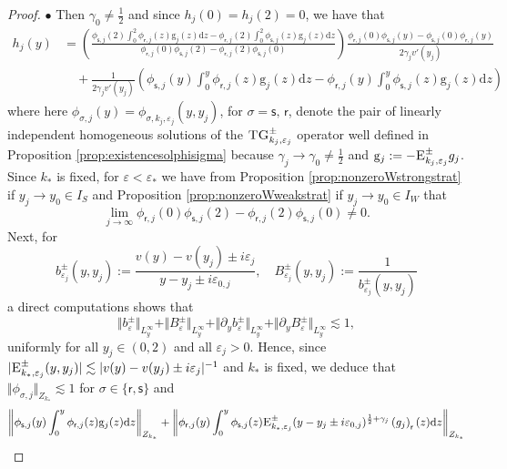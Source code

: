 \documentclass[11pt,reqno]{amsproc}
\newcommand{\bullpar}[1]{\vspace{.5em}\noindent $\bullet$ \normalfont {\bfseries #1.}}
\theoremstyle{definition}
\numberwithin{equation}{section}
\newcommand{\sr}{{\mathsf{r}}}
\newcommand{\s}{{\mathsf{s}}}
\renewcommand{\d}{\mathrm{d}}
\newcommand{\ep}{\varepsilon}
\renewcommand{\P}{{\mathcal{P}}}
\begin{document}
\begin{proof}
\bullpar{Case $\P(y_0)\neq 0$} Then $\gamma_0\neq \frac12$ and since $h_j(0)=h_j(2)=0$, we have that
\begin{align*}
h_j(y)&= \left( \frac{\phi_{\s,j}(2)\int_0^2 \phi_{\sr,j}(z) \mathrm{g}_j(z) \d z - \phi_{\sr,j}(2)\int_0^2 \phi_{\s,j}(z) \mathrm{g}_j(z)\d z }{\phi_{\sr,j}(0)\phi_{\s,j}(2) - \phi_{\sr,j}(2)\phi_{\s,j}(0)} \right)  \frac{\phi_{\sr,j}(0)\phi_{\s,j}(y) - \phi_{\s,j}(0)\phi_{\sr,j}(y)}{2\gamma_j v'(y_j)} \\
&\quad + \frac{1}{2\gamma_jv'(y_j)} \left( \phi_{\s,j}(y) \int_0^y \phi_{\sr,j}(z)\mathrm{g}_j(z) \d z - \phi_{\sr,j}(y) \int_0^y \phi_{\s,j}(z)\mathrm{g}_j(z) \d z \right)
\end{align*}
where here $\phi_{\sigma,j}(y)=\phi_{\sigma,k_j,\ep_j}(y,y_j)$, for $\sigma = \s,\,\sr$, denote the pair of linearly independent homogeneous solutions of the $\textsc{TG}_{k_j,\ep_j}^\pm$ operator well defined in Proposition  \ref{prop:existencesolphisigma} because $\gamma_j\rightarrow \gamma_0\neq\frac12$ and $\mathrm{g}_j:=-\textsc{E}_{k_j,\ep_j}^\pm g_j$. Since $k_*$ is fixed, for $\ep<\ep_*$ we have from Proposition \ref{prop:nonzeroWstrongstrat} if $y_j\rightarrow y_0\in I_S$ and Proposition \ref{prop:nonzeroWweakstrat} if $y_j\rightarrow y_0\in I_W$ that 
\begin{equation}\label{eq:nonzeroweakstrongWlim}
\lim_{j\rightarrow \infty} \phi_{\sr,j}(0)\phi_{\s,j}(2) - \phi_{\sr,j}(2)\phi_{\s,j}(0) \neq 0.
\end{equation}
Next, for
\begin{equation}\label{eq:defbB}
b_{\ep_j}^\pm(y,y_j) := \frac{v(y) - v(y_j) \pm i\ep_j}{y-y_j \pm i\ep_{0,j}}, \quad B_{\ep_j}^\pm(y,y_j) := \frac{1}{b_{\ep_j}^\pm(y,y_j)}
\end{equation}
a direct computations shows that 
\begin{equation}\label{eq:boundbB}
\Vert b_{\ep}^\pm \Vert_{L^\infty_y} + \Vert B_{\ep}^\pm \Vert_{L^\infty_y} +  \Vert \partial_y b_{\ep}^\pm \Vert_{L^\infty_y} + \Vert  \partial_y B_{\ep}^\pm \Vert_{L^\infty_y} \lesssim 1,
\end{equation}
uniformly for all $y_j \in (0,2)$ and all $\ep_j>0$. Hence, 
since $|\textsc{E}_{k_*,\ep_j}^\pm(y,y_j)| \lesssim |v(y) - v(y_j) \pm i\ep_j|^{-1}$ and $k_*$ is fixed, we deduce that $\Vert \phi_{\sigma,j} \Vert_{Z_{k_*}} \lesssim 1$ for $\sigma \in \lbrace \sr, \s \rbrace$ and
\begin{align*}
\left\Vert  \phi_{\s,j}(y) \int_0^y \phi_{\sr,j}(z) \mathrm{g}_j(z) \d z \right\Vert_{Z_{k_*}} &+ \left\Vert  \phi_{\sr,j}(y)\int_0^y \phi_{\s,j}(z) \textsc{E}_{k_*,\ep_j}^\pm (y-y_j \pm i\ep_{0,j} )^{\frac12+\gamma_j} \left(g_j \right)_\sr (z) \d z \right\Vert_{Z_{k_*}}  \\

\end{align*}
\end{proof}
\end{document}
